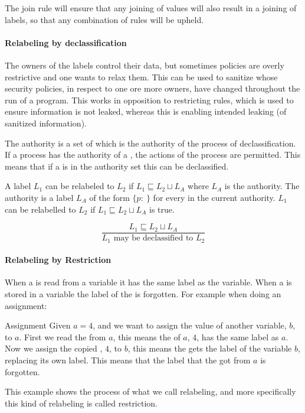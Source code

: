 The join rule will ensure that any joining of values will also result in a joining of labels, so that any combination of rules will be upheld.

\paragraph{Relabeling by declassification}
The owners of the labels control their data, but sometimes policies are overly restrictive and one wants to relax them.
This can be used to sanitize \xvalues{} whose security policies, in respect to one ore more owners, have changed throughout the run of a program.
This works in opposition to restricting rules, which is used to ensure information is not leaked, whereas this is enabling intended leaking (of sanitized information).

The authority is a set of \principals{} which is the authority of the process of declassification.
If a process has the authority of a \principal{}, the actions of the process are permitted.
This means that if a \principal{} is in the authority set this can be declassified.

\begin{definition}
  A label $L_1$ can be relabeled to $L_2$ if $L_1 \sqsubseteq L_2 \sqcup L_A$ where $L_A$ is the authority.
  The authority is a label $L_A$ of the form $\{p: \ \}$ for every \principal{} in the current authority.
  $L_1$ can be relabelled to $L_2$ if $L_1 \sqsubseteq L_2 \sqcup L_A$ is true.
  \begin{center}
    \[\frac{L_1 \sqsubseteq L_2 \sqcup L_A}{L_1 \text{ may be declassified to } L_2}\]    
  \end{center}
\end{definition}

\paragraph{Relabeling by Restriction}
When a \xvalue{} is read from a variable it has the same label as the variable.
When a \xvalue{} is stored in a variable the label of the \xvalue{} is forgotten.
For example when doing an assignment:
\begin{example}{Assignment}
  Given $a = 4$, and we want to assign the value of another variable, $b$, to $a$.
  First we read the \xvalue{} from $a$, this means the \xvalue{} of $a$, $4$, has the same label as $a$.
  Now we assign the copied \xvalue{}, $4$, to $b$, this means the \xvalue{} gets the label of the variable $b$, replacing its own label.
  This means that the label that the \xvalue{} got from $a$ is forgotten.
\end{example}
This example shows the process of what we call relabeling, and more specifically this kind of relabeling is called restriction.

